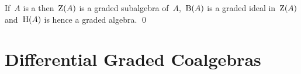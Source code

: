 \documentclass[a4paper,10pt,headings=standardclasses]{scrartcl}
\begin{document}

\begin{proposition}
  If~$A$ is a {\dga} then~$\operatorname{Z}(A)$ is a graded subalgebra of~$A$,~$\operatorname{B}(A)$  is a graded ideal in~$\operatorname{Z}(A)$ and~$\operatorname{H}(A)$ is hence a graded algebra.
  \qed
\end{proposition}




\section{Differential Graded Coalgebras}
\end{document}
